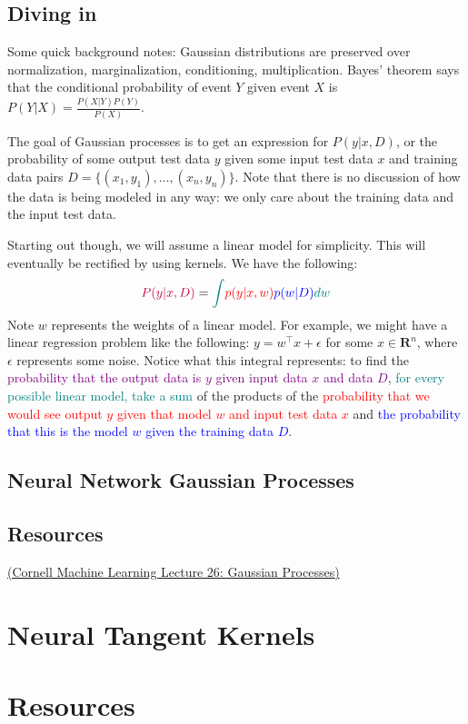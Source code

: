 \documentclass[answers,12pt]{exam}
\begin{document}

\subsection{Diving in}
Some quick background notes:
Gaussian distributions are preserved over normalization, marginalization, conditioning, multiplication.
Bayes' theorem says that the conditional probability of event $Y$ given event $X$ is $P(Y|X)=\frac{P(X|Y)P(Y)}{P(X)}$.

The goal of Gaussian processes is to get an expression for $P(y|x,D)$, or the probability of some output test data $y$ given some input test data $x$ and training data pairs $D = \{(x_1, y_1), \dots , (x_n,y_n)\}$.
Note that there is no discussion of how the data is being modeled in any way: we only care about the training data and the input test data.

Starting out though, we will assume a linear model for simplicity. 
This will eventually be rectified by using kernels.
We have the following:
\[
    \begin{aligned}
        \textcolor{purple}{P(y|x,D)} = \textcolor{teal}{\int} \textcolor{red}{p(y|x,w)}\textcolor{blue}{p(w|D)}\textcolor{teal}{dw}
    \end{aligned}
\]
Note $w$ represents the weights of a linear model. 
For example, we might have a linear regression problem like the following: $y = w^{\top}x + \epsilon$ for some $x \in \mathbf{R}^n$, where $\epsilon$ represents some noise.
Notice what this integral represents: 
to find the \textcolor{purple}{probability that the output data is $y$ given input data $x$ and data $D$}, \textcolor{teal}{for every possible linear model, take a sum} of the products of the \textcolor{red}{probability that we would see output $y$ given that model $w$ and input test data $x$} and \textcolor{blue}{the probability that this is the model $w$ given the training data $D$}.

\subsection{Neural Network Gaussian Processes}

\subsection{Resources} 
\href{https://www.cs.cornell.edu/courses/cs4780/2018fa/lectures/lecturenote15.html}{(Cornell Machine Learning Lecture 26: Gaussian Processes)}

\section{Neural Tangent Kernels}

\section{Resources}
\end{document}
